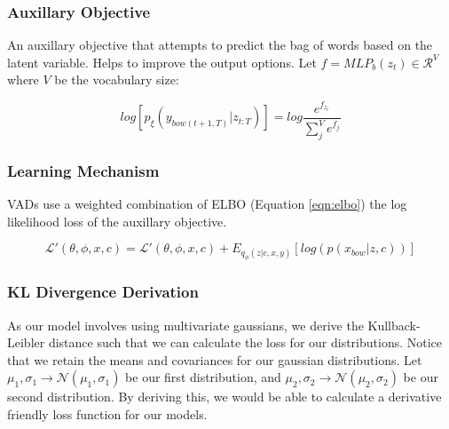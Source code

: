 \documentclass[12pt,twoside]{report}
\begin{document}
\subsubsection{Auxillary Objective}

An auxillary objective that attempts to predict the bag of words based on the latent variable. Helps to improve the output options. Let $f=MLP_b(z_t) \in \mathcal{R}^V$ where $V$ be the vocabulary size:

\begin{equation}
	log [p_\xi(y_{bow(t+1,T)}|z_{t:T}) ] = log  \frac{e^{f_{z_{t}}}}{\sum^V_j e^{f_{j}}}
\end{equation}

\subsubsection{Learning Mechanism}

VADs use a weighted combination of ELBO (Equation \ref{eqn:elbo})  the log likelihood loss of the auxillary objective.

\begin{equation}
	\mathcal{L}'(\theta, \phi, x, c) =\mathcal{L}'(\theta, \phi, x, c) + E_{q_{\phi}(z|c,x,y)}[log(p(x_{bow}|z,c))]
\end{equation}

\subsubsection{KL Divergence Derivation}

As our model involves using multivariate gaussians, we derive the Kullback-Leibler distance such that we can calculate the loss for our distributions. Notice that we retain the means and covariances for our gaussian distributions. Let $\mu_1, \sigma_1 \rightarrow \mathcal{N}(\mu_1,\sigma_1)$ be our first distribution, and $\mu_2, \sigma_2 \rightarrow \mathcal{N}(\mu_2,\sigma_2)$ be our second distribution. By deriving this, we would be able to calculate a derivative friendly loss function for our models.
\end{document}
